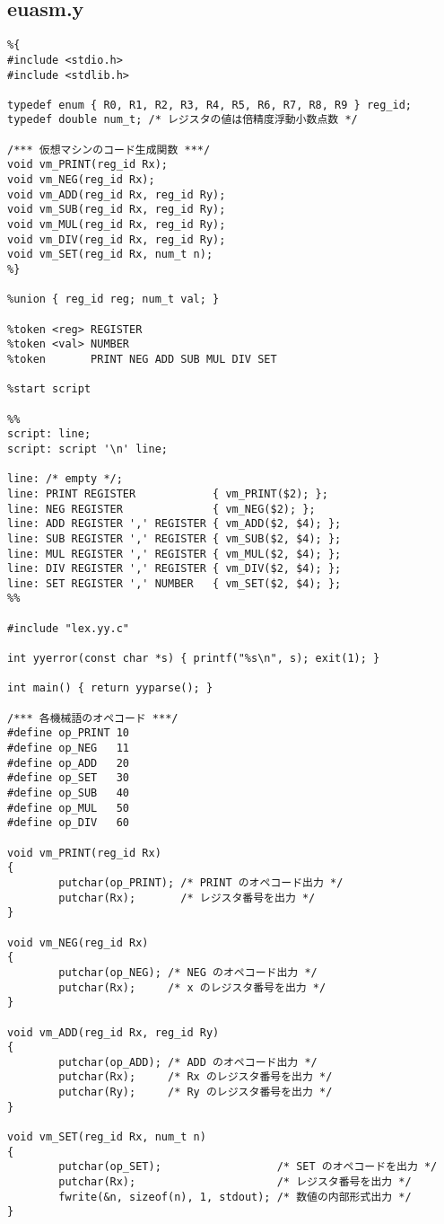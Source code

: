 \documentclass[a4j]{jsarticle}  %
\begin{document}
\subsection{euasm.y}
\begin{verbatim}
%{
#include <stdio.h>
#include <stdlib.h>

typedef enum { R0, R1, R2, R3, R4, R5, R6, R7, R8, R9 } reg_id;
typedef double num_t; /* レジスタの値は倍精度浮動小数点数 */

/*** 仮想マシンのコード生成関数 ***/
void vm_PRINT(reg_id Rx);
void vm_NEG(reg_id Rx);
void vm_ADD(reg_id Rx, reg_id Ry);
void vm_SUB(reg_id Rx, reg_id Ry);
void vm_MUL(reg_id Rx, reg_id Ry);
void vm_DIV(reg_id Rx, reg_id Ry);
void vm_SET(reg_id Rx, num_t n);
%}

%union { reg_id reg; num_t val; }

%token <reg> REGISTER
%token <val> NUMBER
%token       PRINT NEG ADD SUB MUL DIV SET

%start script

%%
script: line;
script: script '\n' line;

line: /* empty */;
line: PRINT REGISTER            { vm_PRINT($2); };
line: NEG REGISTER              { vm_NEG($2); };
line: ADD REGISTER ',' REGISTER { vm_ADD($2, $4); };
line: SUB REGISTER ',' REGISTER { vm_SUB($2, $4); };
line: MUL REGISTER ',' REGISTER { vm_MUL($2, $4); };
line: DIV REGISTER ',' REGISTER { vm_DIV($2, $4); };
line: SET REGISTER ',' NUMBER   { vm_SET($2, $4); };
%%

#include "lex.yy.c"

int yyerror(const char *s) { printf("%s\n", s); exit(1); }

int main() { return yyparse(); }

/*** 各機械語のオペコード ***/
#define op_PRINT 10
#define op_NEG   11
#define op_ADD   20
#define op_SET   30
#define op_SUB   40
#define op_MUL   50
#define op_DIV   60

void vm_PRINT(reg_id Rx)
{
        putchar(op_PRINT); /* PRINT のオペコード出力 */
        putchar(Rx);       /* レジスタ番号を出力 */
}

void vm_NEG(reg_id Rx)
{
        putchar(op_NEG); /* NEG のオペコード出力 */
        putchar(Rx);     /* x のレジスタ番号を出力 */
}

void vm_ADD(reg_id Rx, reg_id Ry)
{
        putchar(op_ADD); /* ADD のオペコード出力 */
        putchar(Rx);     /* Rx のレジスタ番号を出力 */
        putchar(Ry);     /* Ry のレジスタ番号を出力 */
}

void vm_SET(reg_id Rx, num_t n)
{
        putchar(op_SET);                  /* SET のオペコードを出力 */
        putchar(Rx);                      /* レジスタ番号を出力 */
        fwrite(&n, sizeof(n), 1, stdout); /* 数値の内部形式出力 */
}


\end{verbatim}
\end{document}
